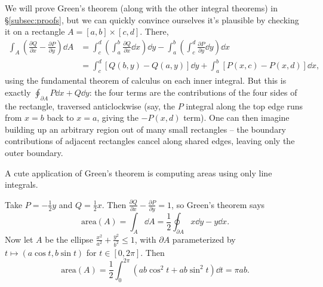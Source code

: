 \documentclass[a4paper]{scrartcl}
\begin{document}
\begin{center}
\end{center}

We will prove Green's theorem (along with the other integral theorems) in \S\ref{subsec:proofs}, but we can quickly convince ourselves it's plausible by checking it on a rectangle $A = [a, b] \times [c, d]$. There,
\begin{align*}
	\int_A \left(\frac{\partial Q}{\partial x} - \frac{\partial P}{\partial y}\right) \dd A
	&= \int_c^d \left(\int_a^b \frac{\partial Q}{\partial x} \dd x \right) \dd y - \int_a^b \left(\int_c^d \frac{\partial P}{\partial y} \dd y\right) \dd x \\
	&= \int_c^d \left[Q(b, y) - Q(a, y)\right] \dd y + \int_a^b \left[P(x, c) - P(x, d)\right] \dd x,
\end{align*}
using the fundamental theorem of calculus on each inner integral. But this is exactly $\oint_{\partial A} P \dd x + Q \dd y$: the four terms are the contributions of the four sides of the rectangle, traversed anticlockwise (say, the $P$ integral along the top edge runs from $x = b$ back to $x = a$, giving the $-P(x, d)$ term). One can then imagine building up an arbitrary region out of many small rectangles -- the boundary contributions of adjacent rectangles cancel along shared edges, leaving only the outer boundary.

A cute application of Green's theorem is computing areas using only line integrals.

\begin{example}
	Take $P = -\frac{1}{2} y$ and $Q = \frac{1}{2}x$. Then $\frac{\partial Q}{\partial x} - \frac{\partial P}{\partial y} = 1$, so Green's theorem says
	$$
	\text{area}(A) = \int_A \dd A = \frac{1}{2}\oint_{\partial A} x \dd y - y \dd x.
	$$
	Now let $A$ be the ellipse $\frac{x^2}{a^2} + \frac{y^2}{b^2} \leq 1$, with $\partial A$ parameterized by $t \mapsto (a \cos t, b \sin t)$ for $t \in [0, 2\pi]$. Then
	$$
	\text{area}(A) = \frac{1}{2}\int_0^{2 \pi} \left(a b\cos^2 t + ab \sin^2 t \right) \dd t = \pi a b.
	$$
\end{example}
\end{document}
